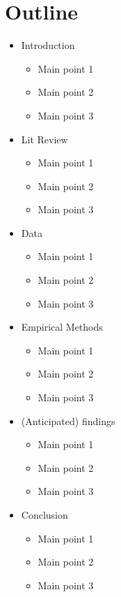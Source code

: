 \documentclass[12pt,english]{article}
\begin{document}
\section{Outline}
\begin{itemize}
\item Introduction
    \begin{itemize}
    \item Main point 1
    \item Main point 2
    \item Main point 3
    \end{itemize}
\item Lit Review
    \begin{itemize}
    \item Main point 1
    \item Main point 2
    \item Main point 3
    \end{itemize}
\item Data
    \begin{itemize}
    \item Main point 1
    \item Main point 2
    \item Main point 3
    \end{itemize}
\item Empirical Methods
    \begin{itemize}
    \item Main point 1
    \item Main point 2
    \item Main point 3
    \end{itemize}
\item (Anticipated) findings
    \begin{itemize}
    \item Main point 1
    \item Main point 2
    \item Main point 3
    \end{itemize}
\item Conclusion
    \begin{itemize}
    \item Main point 1
    \item Main point 2
    \item Main point 3
    \end{itemize}
\end{itemize}


\nocite{*}

\end{document}
